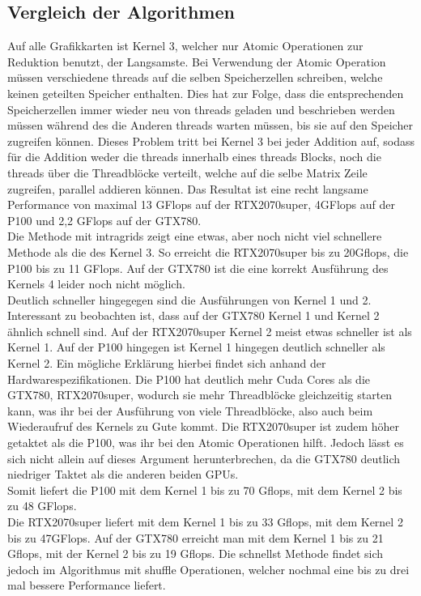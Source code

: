 \documentclass[10pt,a4paper]{article}
\begin{document}
	 \subsection{Vergleich der Algorithmen}
	 Auf alle Grafikkarten ist Kernel 3, welcher nur Atomic Operationen zur Reduktion benutzt, der Langsamste. Bei Verwendung der Atomic Operation müssen verschiedene threads auf die selben Speicherzellen schreiben, welche keinen geteilten Speicher enthalten. Dies hat zur Folge, dass die entsprechenden Speicherzellen immer wieder neu von threads geladen und beschrieben werden müssen während des die Anderen threads warten müssen, bis sie auf den Speicher zugreifen können. Dieses Problem tritt bei Kernel 3 bei jeder Addition auf, sodass für die Addition weder die threads innerhalb eines threads Blocks, noch die threads über die Threadblöcke verteilt, welche auf die selbe Matrix Zeile zugreifen, parallel addieren können. Das Resultat ist eine recht langsame Performance von maximal 13 GFlops auf der RTX2070super, 4GFlops auf der P100 und 2,2 GFlops auf der GTX780. \\
	 Die Methode mit intragrids zeigt eine etwas, aber noch nicht viel schnellere Methode als die des Kernel 3. So erreicht die RTX2070super bis zu 20Gflops, die P100 bis zu 11 GFlops. Auf der GTX780 ist die eine korrekt Ausführung des Kernels 4 leider noch nicht möglich.\\
	 Deutlich schneller hingegegen sind die Ausführungen von Kernel 1 und 2.
	 Interessant zu beobachten ist, dass auf der GTX780 Kernel 1 und Kernel 2 ähnlich schnell sind. Auf der RTX2070super Kernel 2 meist etwas schneller ist als Kernel 1. Auf der P100 hingegen ist Kernel 1 hingegen deutlich schneller als Kernel 2. Ein mögliche Erklärung hierbei findet sich anhand der Hardwarespezifikationen. Die P100 hat deutlich mehr Cuda Cores als die GTX780, RTX2070super, wodurch sie mehr Threadblöcke gleichzeitig starten kann, was ihr bei der Ausführung von viele Threadblöcke, also auch beim Wiederaufruf des Kernels zu Gute kommt. Die RTX2070super ist zudem höher getaktet als die P100, was ihr bei den Atomic Operationen hilft. Jedoch lässt es sich nicht allein auf dieses Argument herunterbrechen, da die GTX780 deutlich niedriger Taktet als die anderen beiden GPUs.\\
	 Somit liefert die P100 mit dem Kernel 1 bis zu 70 Gflops, mit dem Kernel 2 bis zu 48 GFlops.\\
	 Die RTX2070super liefert mit dem Kernel 1 bis zu 33 Gflops, mit dem Kernel 2 bis zu 47GFlops.
	 Auf der GTX780 erreicht man mit dem Kernel 1 bis zu 21 Gflops, mit der Kernel 2 bis zu 19 Gflops. 
	 Die schnellst Methode findet sich jedoch im Algorithmus mit shuffle Operationen, welcher nochmal eine bis zu drei mal bessere Performance liefert.
\end{document}
